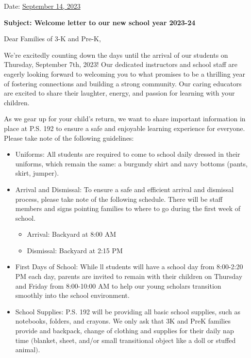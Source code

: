 \documentclass[12pt,letterpaper]{article}
\begin{document}
\vspace*{0.5in}
Date: \href{https://www.ps192.org/apps/bbmessages/show_bbm.jsp?REC_ID=139439}{September 14, 2023} 

\textbf{Subject: Welcome letter to our new school year 2023-24}

Dear Families of 3-K and Pre-K,

We're excitedly counting down the days until the arrival of our students on Thursday, September 7th, 2023! Our dedicated instructors and school staff are eagerly looking
forward to welcoming you to what promises to be a thrilling year of fostering connections
and building a strong community. Our caring educators are excited to share their laughter,
energy, and passion for learning with your children.

As we gear up for your child's return, we want to share important information in place at
P.S. 192 to ensure a safe and enjoyable learning experience for everyone. Please take note
of the following guidelines:
	\begin{itemize}
	\item Uniforms: All students are required to come to school daily dressed in their
	uniforms, which remain the same: a burgundy shirt and navy bottoms (pants, skirt,
	jumper).
	\item Arrival and Dismissal: To ensure a safe and efficient arrival and dismissal 
	process, please take note of the following schedule. There will be staff members and
	signs pointing families to where to go during the first week of school.
		\begin{itemize}
		\item Arrival: Backyard at 8:00 AM
		\item Dismissal: Backyard at 2:15 PM
		\end{itemize}
	\item First Days of School: While ll students will have a school day from 8:00-2:20 PM
	each day, parents are invited to remain with their children on Thursday and Friday from
	8:00-10:00 AM to help our young scholars transition smoothly into the school
	environment.
	\item School Supplies: P.S. 192 will be providing all basic school supplies, such as
	notebooks, folders, and crayons. We only ask that 3K and PreK families provide and
	backpack, change of clothing and supplies for their daily nap time $($blanket, sheet,
	and/or small transitional object like a doll or stuffed animal$)$.
	\end{itemize}
\end{document}

